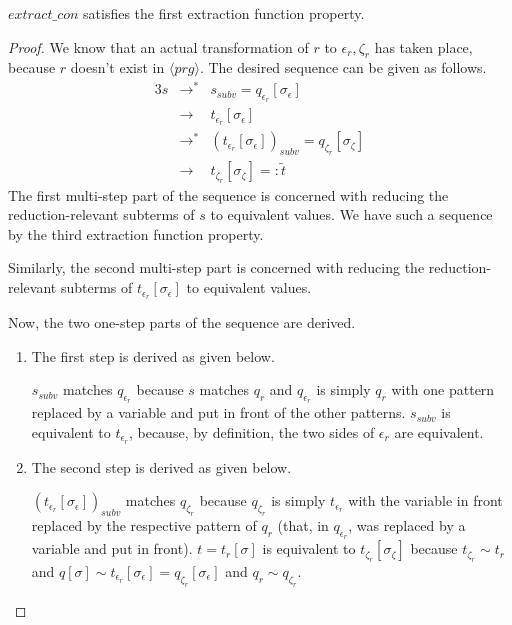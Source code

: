 \begin{lemma}

$extract\_con$ satisfies the first extraction function property.

\begin{proof}

We know that an actual transformation of $r$ to $\epsilon_r, \zeta_r$ has taken place, because $r$ doesn't exist in $\langle prg \rangle$. The desired sequence can be given as follows.
\begin{alignat*}{3}
s &\longrightarrow^* &s_{subv} = q_{\epsilon_r}[\sigma_\epsilon]\\
&\longrightarrow &t_{\epsilon_r}[\sigma_\epsilon]\\
&\longrightarrow^*  &(t_{\epsilon_r}[\sigma_\epsilon])_{subv} = q_{\zeta_r}[\sigma_\zeta]\\
&\longrightarrow &t_{\zeta_r}[\sigma_\zeta] =: \widetilde{t}
\end{alignat*}
The first multi-step part of the sequence is concerned with reducing the reduction-relevant subterms of $s$ to equivalent values. We have such a sequence by the third extraction function property.

Similarly, the second multi-step part is concerned with reducing the reduction-relevant subterms of $t_{\epsilon_r}[\sigma_\epsilon]$ to equivalent values.

Now, the two one-step parts of the sequence are derived.

\begin{enumerate}
\item The first step is derived as given below.
\begin{prooftree}
\end{prooftree}
$s_{subv}$ matches $q_{\epsilon_r}$ because $s$ matches $q_r$ and $q_{\epsilon_r}$ is simply $q_r$ with one pattern replaced by a variable and put in front of the other patterns. $s_{subv}$ is equivalent to $t_{\epsilon_r}$, because, by definition, the two sides of $\epsilon_r$ are equivalent.

\item The second step is derived as given below.
\begin{prooftree}
\end{prooftree}
$(t_{\epsilon_r}[\sigma_\epsilon])_{subv}$ matches $q_{\zeta_r}$ because $q_{\zeta_r}$ is simply $t_{\epsilon_r}$ with the variable in front replaced by the respective pattern of $q_r$ (that, in $q_{\epsilon_r}$, was replaced by a variable and put in front). $t = t_r[\sigma]$ is equivalent to $t_{\zeta_r}[\sigma_\zeta]$ because $t_{\zeta_r} \sim t_r$ and $q[\sigma] \sim t_{\epsilon_r}[\sigma_\epsilon] = q_{\zeta_r}[\sigma_\epsilon]$ and $q_r \sim q_{\zeta_r}$.


\end{enumerate}
\end{proof}
\end{lemma}
